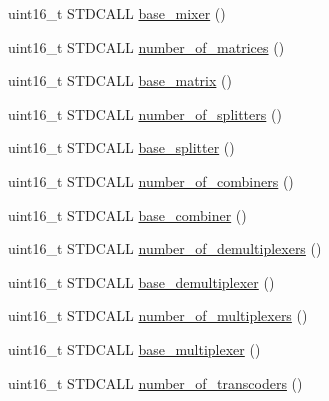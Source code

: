 \begin{DoxyCompactItemize}
\item 
uint16\+\_\+t S\+T\+D\+C\+A\+LL \hyperlink{classavdecc__lib_1_1audio__unit__descriptor__response__imp_abd249499bb00502ea8a580ffc2fdf941}{base\+\_\+mixer} ()
\item 
uint16\+\_\+t S\+T\+D\+C\+A\+LL \hyperlink{classavdecc__lib_1_1audio__unit__descriptor__response__imp_a5279431d291858b25439adb9e1b39303}{number\+\_\+of\+\_\+matrices} ()
\item 
uint16\+\_\+t S\+T\+D\+C\+A\+LL \hyperlink{classavdecc__lib_1_1audio__unit__descriptor__response__imp_ad05a836000fb46030aa3e711c62ff839}{base\+\_\+matrix} ()
\item 
uint16\+\_\+t S\+T\+D\+C\+A\+LL \hyperlink{classavdecc__lib_1_1audio__unit__descriptor__response__imp_a7c8653105661b876eac9e7887ecd3875}{number\+\_\+of\+\_\+splitters} ()
\item 
uint16\+\_\+t S\+T\+D\+C\+A\+LL \hyperlink{classavdecc__lib_1_1audio__unit__descriptor__response__imp_ae1fa8305301b767d4dccad786bdcbab7}{base\+\_\+splitter} ()
\item 
uint16\+\_\+t S\+T\+D\+C\+A\+LL \hyperlink{classavdecc__lib_1_1audio__unit__descriptor__response__imp_aeed789f354b0e54a662943c19e8df7cd}{number\+\_\+of\+\_\+combiners} ()
\item 
uint16\+\_\+t S\+T\+D\+C\+A\+LL \hyperlink{classavdecc__lib_1_1audio__unit__descriptor__response__imp_a895e662a07126bf912c727c641ae1a1c}{base\+\_\+combiner} ()
\item 
uint16\+\_\+t S\+T\+D\+C\+A\+LL \hyperlink{classavdecc__lib_1_1audio__unit__descriptor__response__imp_a99a937ff76c67f4fcd00684a1af548ca}{number\+\_\+of\+\_\+demultiplexers} ()
\item 
uint16\+\_\+t S\+T\+D\+C\+A\+LL \hyperlink{classavdecc__lib_1_1audio__unit__descriptor__response__imp_a1298e3dadbdd79bfeb95b6a0a495557b}{base\+\_\+demultiplexer} ()
\item 
uint16\+\_\+t S\+T\+D\+C\+A\+LL \hyperlink{classavdecc__lib_1_1audio__unit__descriptor__response__imp_a744d3fe2305d69cbb9413d328b15a301}{number\+\_\+of\+\_\+multiplexers} ()
\item 
uint16\+\_\+t S\+T\+D\+C\+A\+LL \hyperlink{classavdecc__lib_1_1audio__unit__descriptor__response__imp_ab9772068431f8f7fc8d0fccd7eac56a5}{base\+\_\+multiplexer} ()
\item 
uint16\+\_\+t S\+T\+D\+C\+A\+LL \hyperlink{classavdecc__lib_1_1audio__unit__descriptor__response__imp_afdc1ba3d5f109525cae00afe151e76e3}{number\+\_\+of\+\_\+transcoders} ()
\item 

\end{DoxyCompactItemize}
